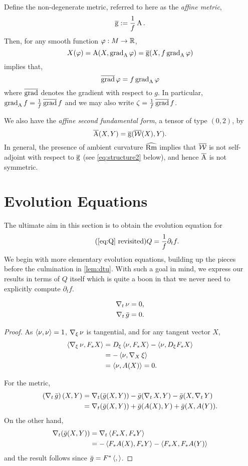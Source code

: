 \documentclass{amsart}
\begin{document}
Define the non-degenerate metric, referred to here as the \emph{affine metric},
\begin{equation}
\label{eq:affg}
\affg := \frac{1}{f} \sff.
\end{equation}
Then, for any smooth function $\varphi : M \to \RR$,
\[
X(\varphi) = \sff(X, \grad_{\sff} \varphi) = \affg(X, f \grad_{\sff} \varphi)
\]
implies that,
\[
\affgrad \varphi = f \grad_{\sff} \varphi
\]
where $\affgrad$ denotes the gradient with respect to $g$. In particular, $\grad_{\sff} f = \tfrac{1}{f} \affgrad f$ and we may also write $\tangvel = \tfrac{1}{f} \affgrad f$.

We also have the \emph{affine second fundamental form}, a tensor of type $(0, 2)$, by
\[
\affsff (X, Y) = \affg(\affshape(X), Y).
\]
In general, the presence of ambient curvature $\bgRm$ implies that $\affshape$ is not self-adjoint with respect to $\affg$ (see \eqref{eq:structure2} below), and hence $\affsff$ is not symmetric.

\section{Evolution Equations}


The ultimate aim in this section is to obtain the evolution equation for
\[
\tag{\ref{eq:Q} revisited} Q = \frac{1}{f} \partial_t f.
\]
We begin with more elementary evolution equations, building up the pieces before the culmination in \cref{lem:dtu}. With such a goal in mind, we express our results in terms of $Q$ itself which is quite a boon in that we never need to explicitly compute \(\partial_t f\).

\begin{lemma}
\label{lem:gaussmap}
\begin{align}
\D_t \nor & = 0, \\
\D_t \bar{g} &= 0.
\end{align}
\end{lemma}

\begin{proof}
As $\ip{\nor}{\nor} = 1$, $\D_{\vel} \nor$ is tangential, and for any tangent vector $X$,
\[
\begin{split}
\ip{\D_{\vel} \nor}{F_{\ast} X} &= D_{\vel} \ip{\nor}{F_{\ast}X} - \ip{\nor}{D_{\vel} F_{\ast} X} \\
&= -\ip{\nor}{\D_{X}\vel} \\
&= \ip{\nor}{A(X)} = 0.
\end{split}
\]

For the metric,
\[
\begin{split}
\left(\D_t \bar{g}\right) (X, Y) &= \D_t (\bar{g}(X, Y)) - \bar{g}(\D_t X, Y) - \bar{g}(X, \D_t Y) \\
&= \D_t (\bar{g}(X, Y)) + \bar{g}(A(X), Y) + \bar{g}(X, A(Y)).
\end{split}
\]
On the other hand,
\[
\begin{split}
\D_t (\bar{g}(X, Y)) &= \D_t \ip{F_{\ast} X}{F_{\ast} Y} \\
&= -\ip{F_{\ast} A(X)}{F_{\ast} Y} - \ip{F_{\ast} X}{F_{\ast} A(Y)}
\end{split}
\]
and the result follows since $\bar{g} = F^{\ast} \ip{}{}$.
\end{proof}
\end{document}
